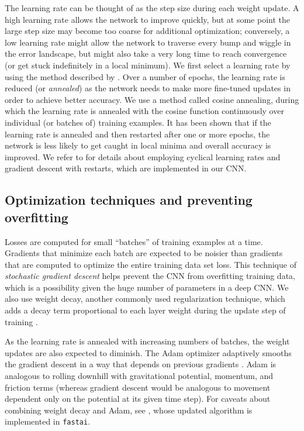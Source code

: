 \documentclass[fleqn,usenatbib]{mnras}
\begin{document}
The learning rate can be thought of as the step size during each weight update. A high learning rate allows the network to improve quickly, but at some point the large step size may become too coarse for additional optimization; conversely, a low learning rate might allow the network to traverse every bump and wiggle in the error landscape, but might also take a very long time to reach convergence (or get stuck indefinitely in a local minimum). We first select a learning rate by using the method described by \cite{CLR}. Over a number of epochs, the learning rate is reduced (or \textit{annealed}) as the network needs to make more fine-tuned updates in order to achieve better accuracy. We use a method called cosine annealing, during which the learning rate is annealed with the cosine function continuously over individual (or batches of) training examples.
It has been shown that if the learning rate is annealed and then restarted after one or more epochs, the network is less likely to get caught in local minima and overall accuracy is improved. We refer to \cite{SGDR} for details about employing cyclical learning rates and gradient descent with restarts, which are implemented in our CNN.

\subsection{Optimization techniques and preventing overfitting} \label{sec:optimization}

Losses are computed for small ``batches'' of training examples at a time. Gradients that minimize each batch are expected to be noisier than gradients that are computed to optimize the entire training data set loss. This technique of \textit{stochastic gradient descent} helps prevent the CNN from overfitting training data, which is a possibility given the huge number of parameters in a deep CNN. We also use weight decay, another commonly used regularization technique, which adds a decay term proportional to each layer weight during the update step of training .

As the learning rate is annealed with increasing numbers of batches, the weight updates are also expected to diminish.
The Adam optimizer adaptively smooths the gradient descent in a way that depends on previous gradients \citep{Kingma2014}.
Adam is analogous to rolling downhill with gravitational potential, momentum, and friction terms (whereas gradient descent would be analogous to movement dependent only on the potential at its given time step).
For caveats about combining weight decay and Adam, see \cite{Loshchilov2017}, whose updated algorithm is implemented in \texttt{fastai}.
\end{document}
